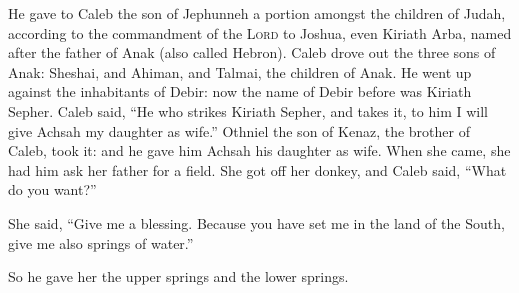  He gave to Caleb the son of Jephunneh a portion amongst
the children of Judah, according to the commandment of the \textsc{Lord}
to Joshua, even Kiriath Arba, named after the father of Anak (also
called Hebron).  Caleb drove out the three sons of Anak:
Sheshai, and Ahiman, and Talmai, the children of Anak. 
He went up against the inhabitants of Debir: now the name of Debir
before was Kiriath Sepher.  Caleb said, ``He who strikes
Kiriath Sepher, and takes it, to him I will give Achsah my daughter as
wife.''  Othniel the son of Kenaz, the brother of Caleb,
took it: and he gave him Achsah his daughter as wife. 
When she came, she had him ask her father for a field. She got off her
donkey, and Caleb said, ``What do you want?''

 She said, ``Give me a blessing. Because you have set me
in the land of the South, give me also springs of water.''

So he gave her the upper springs and the lower springs.

